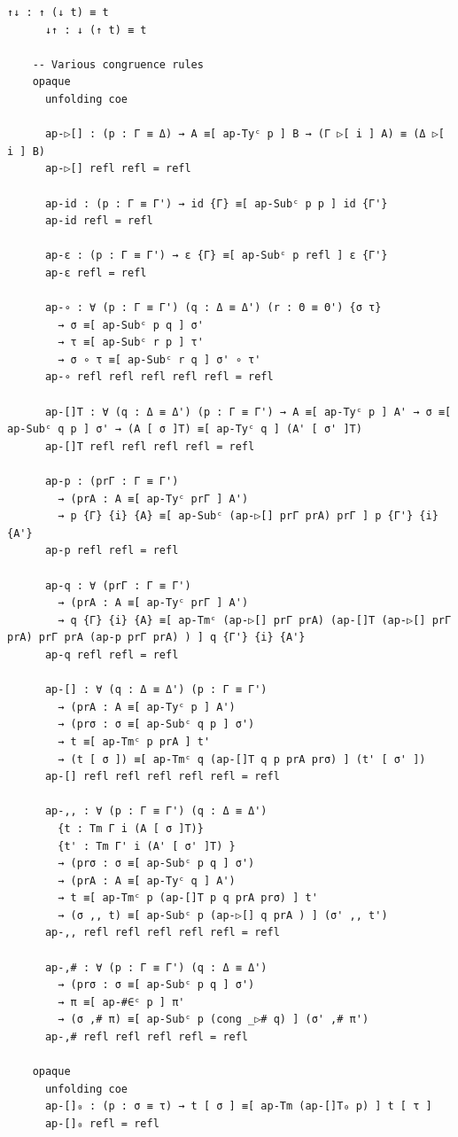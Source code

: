 \documentclass[10pt,a4paper]{article}
\theoremstyle{definition}
\theoremstyle{remark}
\begin{document}
{\begin{Verbatim}[breaklines=true,breakanywhere=true,fontsize=\scriptsize]
      ↑↓ : ↑ (↓ t) ≡ t
      ↓↑ : ↓ (↑ t) ≡ t

    -- Various congruence rules
    opaque
      unfolding coe

      ap-▷[] : (p : Γ ≡ Δ) → A ≡[ ap-Tyᶜ p ] B → (Γ ▷[ i ] A) ≡ (Δ ▷[ i ] B)
      ap-▷[] refl refl = refl

      ap-id : (p : Γ ≡ Γ') → id {Γ} ≡[ ap-Subᶜ p p ] id {Γ'}
      ap-id refl = refl

      ap-ε : (p : Γ ≡ Γ') → ε {Γ} ≡[ ap-Subᶜ p refl ] ε {Γ'}
      ap-ε refl = refl

      ap-∘ : ∀ (p : Γ ≡ Γ') (q : Δ ≡ Δ') (r : Θ ≡ Θ') {σ τ}
        → σ ≡[ ap-Subᶜ p q ] σ'
        → τ ≡[ ap-Subᶜ r p ] τ'
        → σ ∘ τ ≡[ ap-Subᶜ r q ] σ' ∘ τ'
      ap-∘ refl refl refl refl refl = refl

      ap-[]T : ∀ (q : Δ ≡ Δ') (p : Γ ≡ Γ') → A ≡[ ap-Tyᶜ p ] A' → σ ≡[ ap-Subᶜ q p ] σ' → (A [ σ ]T) ≡[ ap-Tyᶜ q ] (A' [ σ' ]T)
      ap-[]T refl refl refl refl = refl

      ap-p : (prΓ : Γ ≡ Γ')
        → (prA : A ≡[ ap-Tyᶜ prΓ ] A')
        → p {Γ} {i} {A} ≡[ ap-Subᶜ (ap-▷[] prΓ prA) prΓ ] p {Γ'} {i} {A'}
      ap-p refl refl = refl

      ap-q : ∀ (prΓ : Γ ≡ Γ')
        → (prA : A ≡[ ap-Tyᶜ prΓ ] A')
        → q {Γ} {i} {A} ≡[ ap-Tmᶜ (ap-▷[] prΓ prA) (ap-[]T (ap-▷[] prΓ prA) prΓ prA (ap-p prΓ prA) ) ] q {Γ'} {i} {A'}
      ap-q refl refl = refl

      ap-[] : ∀ (q : Δ ≡ Δ') (p : Γ ≡ Γ')
        → (prA : A ≡[ ap-Tyᶜ p ] A')
        → (prσ : σ ≡[ ap-Subᶜ q p ] σ')
        → t ≡[ ap-Tmᶜ p prA ] t'
        → (t [ σ ]) ≡[ ap-Tmᶜ q (ap-[]T q p prA prσ) ] (t' [ σ' ])
      ap-[] refl refl refl refl refl = refl

      ap-,, : ∀ (p : Γ ≡ Γ') (q : Δ ≡ Δ')
        {t : Tm Γ i (A [ σ ]T)}
        {t' : Tm Γ' i (A' [ σ' ]T) }
        → (prσ : σ ≡[ ap-Subᶜ p q ] σ')
        → (prA : A ≡[ ap-Tyᶜ q ] A')
        → t ≡[ ap-Tmᶜ p (ap-[]T p q prA prσ) ] t'
        → (σ ,, t) ≡[ ap-Subᶜ p (ap-▷[] q prA ) ] (σ' ,, t')
      ap-,, refl refl refl refl refl = refl

      ap-,# : ∀ (p : Γ ≡ Γ') (q : Δ ≡ Δ')
        → (prσ : σ ≡[ ap-Subᶜ p q ] σ')
        → π ≡[ ap-#∈ᶜ p ] π'
        → (σ ,# π) ≡[ ap-Subᶜ p (cong _▷# q) ] (σ' ,# π')
      ap-,# refl refl refl refl = refl

    opaque
      unfolding coe
      ap-[]₀ : (p : σ ≡ τ) → t [ σ ] ≡[ ap-Tm (ap-[]T₀ p) ] t [ τ ]
      ap-[]₀ refl = refl


\end{Verbatim}}
\end{document}
